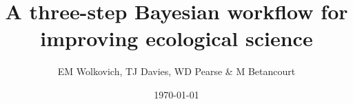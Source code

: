\documentclass[11pt]{article}
\begin{document}

\renewcommand{\refname}{\CHead{}}




\title{A three-step Bayesian workflow for improving ecological science}
\date{\today}
\author{EM Wolkovich, TJ Davies, WD Pearse \& M Betancourt}
\maketitle
\end{document}
